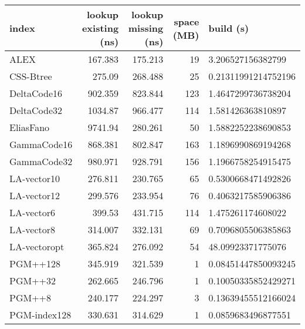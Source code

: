 \begin{tabular}{lrrrl}
\hline
 index             &   lookup existing (ns) &   lookup missing (ns) &   space (MB) & build (s)             \\
\hline
 ALEX              &               167.383  &              175.213  &           19 & 3.206527156382799     \\
 CSS-Btree         &               275.09   &              268.488  &           25 & 0.21311991214752196   \\
 DeltaCode16       &               902.359  &              823.844  &          123 & 1.4647299736738204    \\
 DeltaCode32       &              1034.87   &              966.477  &          114 & 1.581426363810897     \\
 EliasFano         &              9741.94   &              280.261  &           50 & 1.5882252238690853    \\
 GammaCode16       &               868.381  &              802.847  &          163 & 1.1896990869194268    \\
 GammaCode32       &               980.971  &              928.791  &          156 & 1.1966758254915475    \\
 LA-vector10       &               276.811  &              230.765  &           65 & 0.5300668471492826    \\
 LA-vector12       &               299.576  &              233.954  &           76 & 0.4063217585906386    \\
 LA-vector6        &               399.53   &              431.715  &          114 & 1.475261174608022     \\
 LA-vector8        &               314.007  &              332.131  &           69 & 0.7096805506385863    \\
 LA-vectoropt      &               365.824  &              276.092  &           54 & 48.09923371775076     \\
 PGM++128          &               345.919  &              321.539  &            1 & 0.08451447850093245   \\
 PGM++32           &               262.665  &              246.796  &            1 & 0.10050335852429271   \\
 PGM++8            &               240.177  &              224.297  &            3 & 0.13639455512166024   \\
 PGM-index128      &               330.631  &              314.629  &            1 & 0.0859683496877551    \\

\end{tabular}
